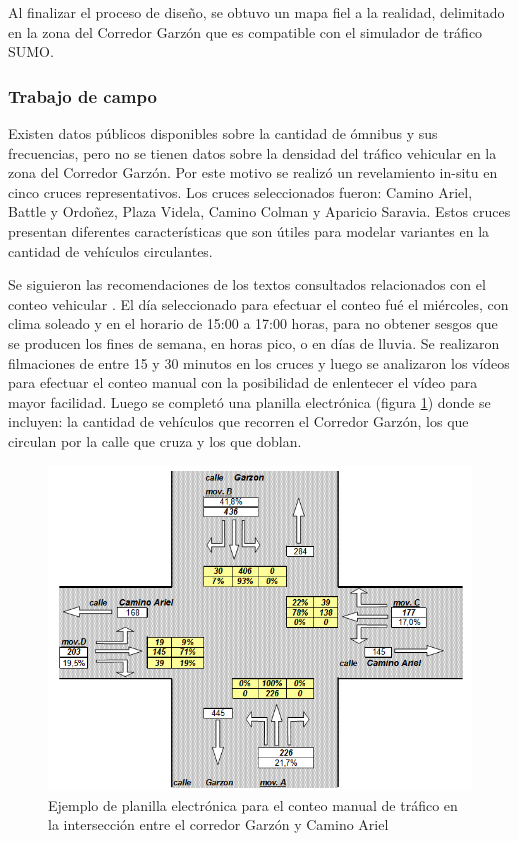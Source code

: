 Al finalizar el proceso de diseño, se obtuvo un mapa fiel a la realidad, delimitado en la zona del Corredor Garzón que es compatible con el simulador de tráfico SUMO.


\subsubsection{Trabajo de campo}

Existen datos públicos disponibles sobre la cantidad de ómnibus y sus frecuencias, pero no se tienen datos sobre la densidad del tráfico vehicular en la zona del Corredor Garzón. Por este motivo se realizó un revelamiento in-situ en cinco cruces representativos. Los cruces seleccionados fueron: Camino Ariel, Battle y Ordoñez, Plaza Videla, Camino Colman y Aparicio Saravia. Estos cruces presentan diferentes características que son útiles para modelar variantes en la cantidad de vehículos circulantes. 

Se siguieron las recomendaciones de los textos consultados relacionados con el conteo vehicular \citep{ConteoTrafico}. El día seleccionado para efectuar el conteo fué el miércoles, con clima soleado y en el horario de 15:00 a 17:00 horas, para no obtener sesgos que se producen los fines de semana, en horas pico, o en días de lluvia. Se realizaron filmaciones de entre 15 y 30 minutos en los cruces y luego se analizaron los vídeos para efectuar el conteo manual con la posibilidad de enlentecer el vídeo para mayor facilidad. Luego se completó una planilla electrónica (figura \ref{fig:conteo_hoja}) donde se incluyen: la cantidad de vehículos que recorren el Corredor Garzón, los que circulan por la calle que cruza y los que doblan. 

\begin{figure}[H]
	\centering
	\includegraphics[width=0.9\linewidth]{Figures/conteo_hoja}
	\caption[Ejemplo de planilla electrónica para el conteo manual de tráfico.]{Ejemplo de planilla electrónica para el conteo manual de tráfico en la intersección entre el corredor Garzón y Camino Ariel}
	\label{fig:conteo_hoja}
\end{figure}



